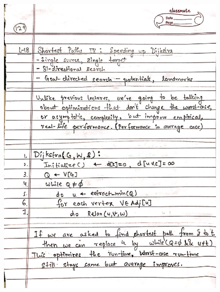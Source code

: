 \newpage
\begin{figure}[H]
    \centering
    \includegraphics[scale=0.25]{"./MIT 6.006/MIT_6006_129"}
\end{figure}
\newpage
